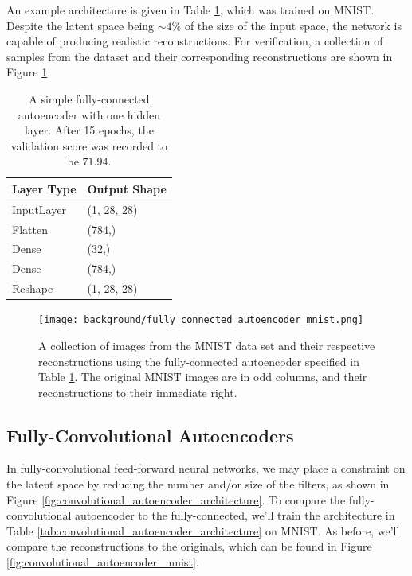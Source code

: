 An example architecture is given in Table \ref{tab:fully_connected_autoencoder_architecture}, which was trained on MNIST. Despite the latent space being $\sim4\%$ of the size of the input space, the network is capable of producing realistic reconstructions. For verification, a collection of samples from the dataset and their corresponding reconstructions are shown in Figure \ref{fig:fully_connected_autoencoder_mnist}.

\begin{table}[h!]
\centering
\captionsetup{justification=centering}
\begin{tabular}{@{}ll@{}}
\toprule
\textbf{Layer Type} & \textbf{Output Shape} \\ \midrule
InputLayer & (1, 28, 28) \\
Flatten & (784,) \\
Dense & (32,) \\
Dense & (784,) \\
Reshape & (1, 28, 28) \\ \bottomrule
\end{tabular}
\caption{A simple fully-connected autoencoder with one hidden layer. After 15 epochs, the validation score was recorded to be $71.94$.}
\label{tab:fully_connected_autoencoder_architecture}
\end{table}

\begin{figure}[H]
\centering
\captionsetup{justification=centering}
\texttt{[image: background/fully\_connected\_autoencoder\_mnist.png]}
\caption{A collection of images from the MNIST data set and their respective reconstructions using the fully-connected autoencoder specified in Table \ref{tab:fully_connected_autoencoder_architecture}. The original MNIST images are in odd columns, and their reconstructions to their immediate right.}
\label{fig:fully_connected_autoencoder_mnist}
\end{figure}

\subsection{Fully-Convolutional Autoencoders}

In fully-convolutional feed-forward neural networks, we may place a constraint on the latent space by reducing the number and/or size of the filters, as shown in Figure \ref{fig:convolutional_autoencoder_architecture}. To compare the fully-convolutional autoencoder to the fully-connected, we'll train the architecture in Table \ref{tab:convolutional_autoencoder_architecture} on MNIST. As before, we'll compare the reconstructions to the originals, which can be found in Figure \ref{fig:convolutional_autoencoder_mnist}.\\

